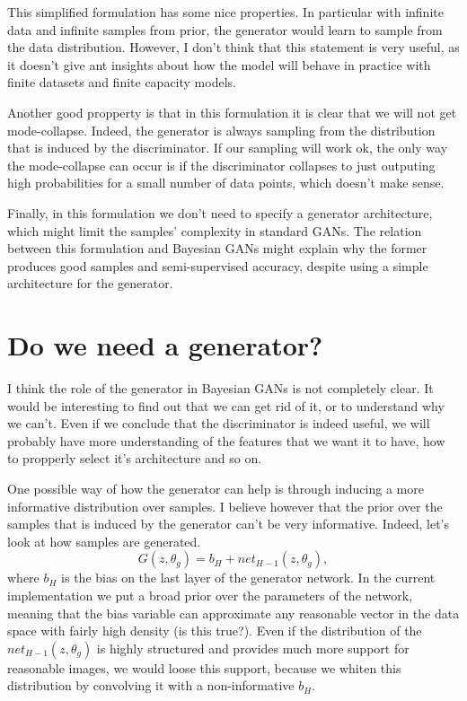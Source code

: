 \documentclass[11pt]{article}
\begin{document}
This simplified formulation has some nice properties. In particular with infinite
data and infinite samples from prior, the generator would learn to sample from
the data distribution. However, I don't think that this statement is very useful,
as it doesn't give ant insights about how the model will behave in practice with
finite datasets and finite capacity models. 

Another good propperty is that in this formulation it is clear that we will
not get mode-collapse. Indeed, the generator is always sampling from the 
distribution that is induced by the discriminator. If our sampling will work
ok, the only way the mode-collapse can occur is if the discriminator collapses
to just outputing high probabilities for a small number of data points, which 
doesn't make sense.

Finally, in this formulation we don't need to specify a generator architecture,
which might limit the samples' complexity in standard GANs. The relation between
this formulation and Bayesian GANs might explain why the former produces good 
samples and semi-supervised accuracy, despite using a simple architecture for
the generator.

\section{Do we need a generator?}

I think the role of the generator in Bayesian GANs is not completely clear. It
would be interesting to find out that we can get rid of it, or to understand 
why we can't. Even if we conclude that the discriminator is indeed useful, we
will probably have more understanding of the features that we want it to have,
how to propperly select it's architecture and so on.

One possible way of how the generator can help is through inducing a more 
informative distribution over samples.
I believe however that the prior over the samples that is induced by the generator
can't be very informative. Indeed, let's look at how samples are generated.
\[
  G(z, \theta_g) = b_H + net_{H-1} (z, \theta_g),
\]
where $b_H$ is the bias on the last layer of the generator network. In the 
current implementation we put a broad prior over the parameters of the network,
meaning that the bias variable can approximate any reasonable vector in the 
data space with fairly high density (is this true?). Even if the distribution of the $net_{H-1}
(z, \theta_g)$ is highly structured and provides much more support for reasonable
images, we would loose this support, because we whiten this distribution by
convolving it with a non-informative $b_H$. 
\end{document}
